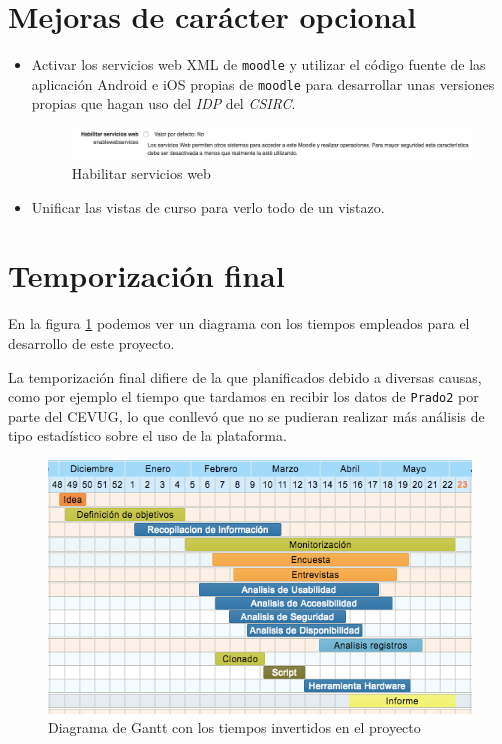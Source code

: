 \section{Mejoras de carácter opcional}
\begin{itemize}
	\item Activar los servicios web XML de \texttt{moodle} y utilizar el código fuente de las aplicación Android e iOS propias de \texttt{moodle} para desarrollar unas versiones propias que hagan uso del \textit{IDP} del \textit{CSIRC}.
	
	
\begin{figure}[H]
\centering
\includegraphics[width=1.0\textwidth]{../screenshots/habilitar_serviciosweb}
\caption{Habilitar servicios web}
\end{figure}

	\item Unificar las vistas de curso para verlo todo de un vistazo.

\end{itemize}

\section{Temporización final}

En la figura \ref{fig:temporizacion2} podemos ver un diagrama con los tiempos empleados para el desarrollo de este proyecto.

\bigskip
La temporización final difiere de la que planificados debido a diversas causas, como por ejemplo el tiempo que tardamos en recibir los datos de \texttt{Prado2} por parte del CEVUG, lo que conllevó que no se pudieran realizar más análisis de tipo estadístico sobre el uso de la plataforma.

\begin{figure}[H]
\centering
\includegraphics[width=1.3\textwidth,angle=90]{../screenshots/temporizacion2}
\caption{Diagrama de Gantt con los tiempos invertidos en el proyecto}
\label{fig:temporizacion2}
\end{figure}

